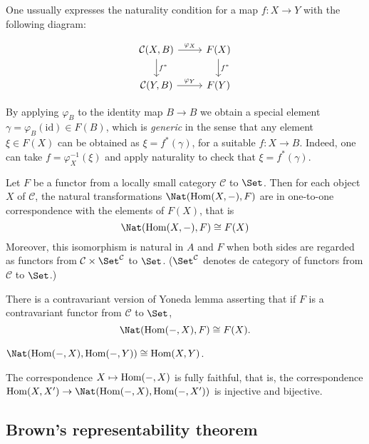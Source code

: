 \begin{remark}
\begin{definition}
\begin{definition}
	One ussually expresses the naturality condition for a map $f:X\to Y$ with the following diagram:

	$$\begin{tikzcd}
		\mathcal{C}(X,B)\arrow[r,"\varphi_{X}"]\arrow[d,"f^{*}"]&F(X)\arrow[d,"f^{*}"]\\
		\mathcal{C}(Y,B)\arrow[r,"\varphi_{Y}"]&F(Y)
	\end{tikzcd}$$
\end{definition}

\begin{remark}
	By applying $\varphi_{B}$ to the identity map  $B\to B$ we obtain a special element $\gamma=\varphi_{B}(\text{id})\in F(B)$, which is \textit{generic} in the sense that any element $\xi \in F(X)$ can be obtained as $\xi=f^{*} (\gamma)$, for a suitable $f:X\to B$. Indeed, one can take $f=\varphi^{-1}_{X}(\xi)$ and apply naturality to check that $\xi=f^{*}(\gamma)$. 
\end{remark}


\begin{lemma}
	Let $F$ be a functor from a locally small category $\mathcal{C}$ to $\Set$. Then for each object $X$ of $\mathcal{C}$, the natural transformations $\Nat(\Hom(X,-),F)$ are in one-to-one correspondence with the elements of $F(X)$, that is
	$$\Nat(\Hom(X,-), F)\cong F(X)$$
	Moreover, this isomorphism is natural in $A$ and $F$ when both sides are regarded as functors from $\mathcal{C}\times\Set^{\mathcal{C}}$ to $\Set$. ($\Set^{\mathcal{C}}$ denotes de category of functors from $\mathcal{C}$ to $\Set$.)
	
	There is a contravariant version of Yoneda lemma asserting that if $F$ is a contravariant functor from $\mathcal{C}$ to $\Set$,
	$$\Nat(\Hom(-,X), F)\cong F(X).$$
\end{lemma}
\begin{coro}
	$\Nat (\Hom(-,X),\Hom(-,Y))\cong\text{Hom}(X,Y)$.
\end{coro}
\begin{remark}
	The correspondence $X\mapsto\mathop{\mathrm{Hom}}\nolimits(-,X)$ is fully faithful, that is, the correspondence $\Hom(X,X')\to\Nat(\text{Hom}(-,X),\text{Hom}(-,X'))$ is injective and bijective.
\end{remark}

\subsection{Brown's representability theorem}


\end{definition}
\end{remark}
